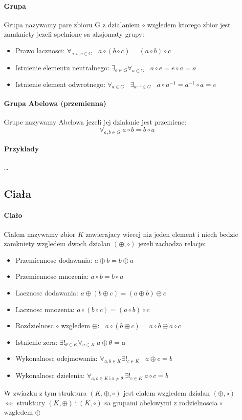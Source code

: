 \documentclass[a4paper]{article}
\begin{document}
\paragraph{Grupa}
Grupa nazywamy pare zbioru G z dzialaniem $\circ$ wzgledem ktorego zbior jest zamkniety jezeli spelnione sa aksjomaty grupy:
\begin{itemize}
    \item Prawo lacznosci: $ \forall_{a,b,c \in G} $ \ $ a \circ (b \circ c) = (a \circ b) \circ c $
    \item Istnienie elementu neutralnego: $\exists_{e \in G} \forall_{a \in G}$ \ $ a \circ e = e \circ a = a $
    \item Istnienie element odwrotnego: $ \forall_{a \in G}$ \ $ \exists_{a^{-1} \in G} $ \ $ a \circ a^{-1} = a^{-1} \circ a = e $
\end{itemize}
\paragraph{Grupa Abelowa (przemienna)}
Grupe nazywamy Abelowa jezeli jej dzialanie jest przemiene:
\begin{equation}
    \forall_{a,b \in G} \ a \circ b = b \circ a
\end{equation}
\paragraph{Przyklady}
\ldots
\subsection{Ciała}
\paragraph{Ciało}
Cialem nazywamy zbior $K$ zawierajacy wiecej niz jeden element i niech bedzie zamkniety wzgledem dwoch dzialan $ (\oplus, \circ) $ jezeli zachodza relacje:
\begin{itemize}
    \item Przemiennosc dodawania: $ a \oplus b = b \oplus a $
    \item Przemiennosc mnozenia: $ a \circ b = b \circ a $
    \item Lacznosc dodawania: $ a \oplus (b \oplus c) = (a \oplus b) \oplus c $
    \item Lacznosc mnozenia: $ a \circ (b \circ c) = (a \circ b) \circ c $
    \item Rozdzielnosc $\circ$ wzgledem $\oplus$: \ $a \circ (b \oplus c) = a \circ b \oplus a \circ c$
    \item Istnienie zera: $ \exists!_{\theta \in K} \forall_{a \in  K} \ a \oplus \theta$ = a
    \item Wykonalnosc odejmowania: $ \forall_{a,b \in K} \exists!_{c \in K}$ \ $ a \oplus c = b $
    \item Wykonalnosc dzielenia: $\forall_{a,b \in K \ \text{i} \ a \ne \theta} \ \exists!_{c \in K} \ a \circ c = b$
\end{itemize}
W zwiazku z tym struktura $ (K, \oplus ,\circ) $ jest cialem wzgledem dzialan $ (\oplus, \circ) $ \ $ \Leftrightarrow $ struktury $ (K, \oplus) \ \text{i} \ (K, \circ) $ sa grupami abelowymi z rodzielnoscia $\circ$ wzgledem $\oplus$
\end{document}
